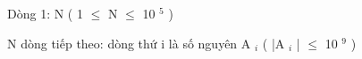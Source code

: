 Dòng 1: N ( 1  $\le$  N  $\le$  10   $^    5   $   )  

   N dòng tiếp theo: dòng thứ  i  là số nguyên  A   $_    i   $   ( |A   $_    i   $   |  $\le$  10   $^    9   $   )  

\